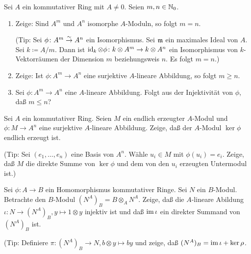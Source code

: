 \begin{exercise}
	Sei \(A\) ein kommutativer Ring mit \(A \neq 0\). Seien \(m, n \in \mathbb N_0\).
	\begin{enumerate}
	\item
		Zeige:
		Sind \(A^m\) und \(A^n\) isomorphe \(A\)-Moduln, so folgt \(m = n\).
		
		(Tip: Sei \(\phi\colon A^m \stackrel\sim\to A^n\) ein Isomorphismus. Sei \(\mathfrak{m}\) ein maximales Ideal von \(A\). Sei
		\(k \coloneqq A/m\). Dann ist \(\operatorname{id}_k \otimes \phi\colon k \otimes A^m \to k \otimes A^n\) ein Isomorphismus
		von \(k\)-Vektorräumen der Dimension \(m\) beziehungsweis \(n\). Es folgt \(m = n\).)
	\item
		Zeige:
		Ist \(\phi\colon A^m \to A^n\) eine surjektive \(A\)-lineare Abbildung, so folgt \(m \ge n\).
	\item
		Sei \(\phi\colon A^m \to A^n\) eine \(A\)-lineare Abbildung. Folgt aus der Injektivität von \(\phi\), daß
		\(m \le n\)?
	\end{enumerate}
\end{exercise}

\begin{exercise}
	\label{exer:fg_ker_map_to_free}
	Sei \(A\) ein kommutativer Ring.
	Seien \(M\) ein endlich erzeugter \(A\)-Modul und \(\phi\colon M \to A^n\) eine surjektive \(A\)-lineare Abbildung.
	Zeige, daß der \(A\)-Modul \(\ker \phi\) endlich erzeugt ist.
	
	(Tip: Sei \((e_1, \dotsc, e_n)\) eine Basis von \(A^n\). Wähle \(u_i \in M\) mit \(\phi(u_i) = e_i\). Zeige, daß
	\(M\) die direkte Summe von \(\ker \phi\) und dem von den \(u_i\) erzeugten Untermodul ist.)
\end{exercise}

\begin{exercise}
	Sei \(\phi\colon A \to B\) ein Homomorphismus kommutativer Ringe. Sei \(N\) ein \(B\)-Modul. Betrachte den
	\(B\)-Modul \((N^A)_B = B \otimes_A N^A\). Zeige, daß die \(A\)-lineare Abildung \(\iota\colon
	N \to (N^A)_B, y \mapsto 1 \otimes y\) injektiv ist und daß \(\operatorname{im} \iota\) ein direkter Summand von \((N^A)_B\) ist.
	
	(Tip: Definiere \(\pi\colon (N^A)_B \to N, b \otimes y \mapsto by\) und zeige, daß \((N^A)_B = \operatorname{im} \iota + \ker \rho\).
\end{exercise}

